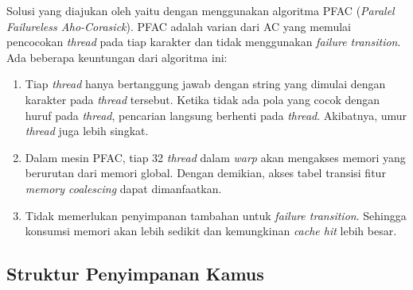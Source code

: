       Solusi yang diajukan oleh \cite{lin2013} yaitu dengan menggunakan algoritma PFAC (\emph{Paralel Failureless Aho-Corasick}). PFAC adalah varian dari AC yang memulai pencocokan \emph{thread} pada tiap karakter dan tidak menggunakan \emph{failure transition}. Ada beberapa keuntungan dari algoritma ini:
    
      \begin{enumerate}

        \item 
        Tiap \emph{thread} hanya bertanggung jawab dengan string yang dimulai dengan karakter pada \emph{thread} tersebut. Ketika tidak ada pola yang cocok dengan huruf pada \emph{thread}, pencarian langsung berhenti pada \emph{thread}. Akibatnya, umur \emph{thread} juga lebih singkat.
        
        \item 
        Dalam mesin PFAC, tiap 32 \emph{thread} dalam \emph{warp} akan mengakses memori yang berurutan dari memori global. Dengan demikian, akses tabel transisi fitur \emph{memory coalescing} dapat dimanfaatkan.
        
        \item
        Tidak memerlukan penyimpanan tambahan untuk \emph{failure transition}. Sehingga konsumsi memori akan lebih sedikit dan kemungkinan \emph{cache hit} lebih besar.
        
      \end{enumerate}
      
      
      
      \subsection{Struktur Penyimpanan Kamus}
      
